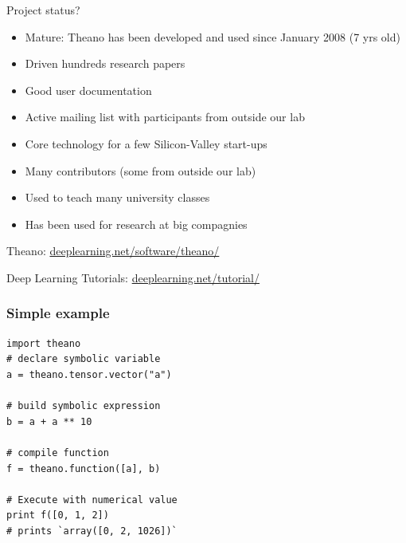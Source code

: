 \documentclass[utf8x,xcolor=pdftex,dvipsnames,table]{beamer}
\begin{document}



\begin{frame}{Project status?}
  \begin{itemize}
    \item Mature: Theano has been developed and used since January 2008 (7 yrs old)
    \item Driven hundreds research papers
    \item Good user documentation
    \item Active mailing list with participants from outside our lab
    \item Core technology for a few Silicon-Valley start-ups
    \item Many contributors (some from outside our lab)
    \item Used to teach many university classes
    \item Has been used for research at big compagnies
  \end{itemize}
  Theano: \url{deeplearning.net/software/theano/}

  Deep Learning Tutorials: \url{deeplearning.net/tutorial/}
\end{frame}

\begin{frame}[fragile]
  \frametitle{Simple example}

\begin{lstlisting}
import theano
# declare symbolic variable
a = theano.tensor.vector("a")

# build symbolic expression
b = a + a ** 10

# compile function
f = theano.function([a], b)

# Execute with numerical value
print f([0, 1, 2])
# prints `array([0, 2, 1026])`
\end{lstlisting}
\end{frame}
\end{document}
